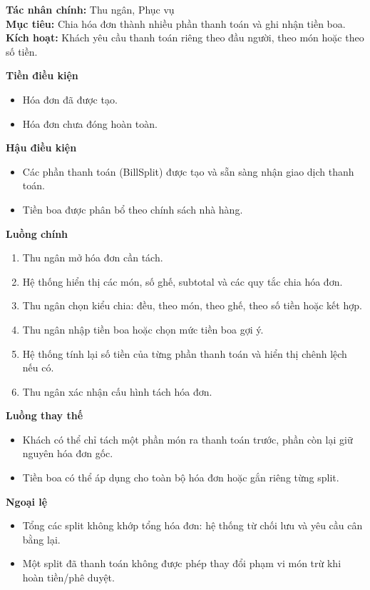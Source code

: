 \documentclass[11pt,a4paper]{article}
\begin{document}
    \begin{usecasebox}[title={UC-BIL-02 --- Tách hóa đơn và thêm tiền boa}]
    \textbf{Tác nhân chính:} Thu ngân, Phục vụ\\
    \textbf{Mục tiêu:} Chia hóa đơn thành nhiều phần thanh toán và ghi nhận tiền boa.\\
    \textbf{Kích hoạt:} Khách yêu cầu thanh toán riêng theo đầu người, theo món hoặc theo số tiền.

    \medskip
    \textbf{Tiền điều kiện}
    \begin{itemize}[leftmargin=1.8em]
  \item Hóa đơn đã được tạo.
  \item Hóa đơn chưa đóng hoàn toàn.
\end{itemize}

    \textbf{Hậu điều kiện}
    \begin{itemize}[leftmargin=1.8em]
  \item Các phần thanh toán (\textsf{BillSplit}) được tạo và sẵn sàng nhận giao dịch thanh toán.
  \item Tiền boa được phân bổ theo chính sách nhà hàng.
\end{itemize}

    \textbf{Luồng chính}
    \begin{enumerate}[leftmargin=1.8em]
  \item Thu ngân mở hóa đơn cần tách.
  \item Hệ thống hiển thị các món, số ghế, subtotal và các quy tắc chia hóa đơn.
  \item Thu ngân chọn kiểu chia: đều, theo món, theo ghế, theo số tiền hoặc kết hợp.
  \item Thu ngân nhập tiền boa hoặc chọn mức tiền boa gợi ý.
  \item Hệ thống tính lại số tiền của từng phần thanh toán và hiển thị chênh lệch nếu có.
  \item Thu ngân xác nhận cấu hình tách hóa đơn.
\end{enumerate}

    \textbf{Luồng thay thế}
    \begin{itemize}[leftmargin=1.8em]
  \item Khách có thể chỉ tách một phần món ra thanh toán trước, phần còn lại giữ nguyên hóa đơn gốc.
  \item Tiền boa có thể áp dụng cho toàn bộ hóa đơn hoặc gắn riêng từng split.
\end{itemize}

    \textbf{Ngoại lệ}
    \begin{itemize}[leftmargin=1.8em]
  \item Tổng các split không khớp tổng hóa đơn: hệ thống từ chối lưu và yêu cầu cân bằng lại.
  \item Một split đã thanh toán không được phép thay đổi phạm vi món trừ khi hoàn tiền/phê duyệt.
\end{itemize}


\end{usecasebox}
\end{document}
